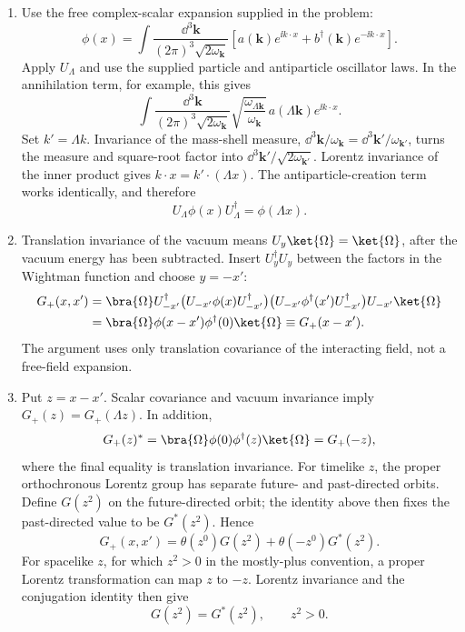 
\begin{enumerate}
\begin{enumerate}
\item
Use the free complex-scalar expansion supplied in the problem:
\[
 \phi(x)=\int\frac{\dd^3\mathbf k}{(2\pi)^3\sqrt{2\omega_{\mathbf k}}}
 \left[a(\mathbf k)e^{\ii k\cdot x}
 +b^\dagger(\mathbf k)e^{-\ii k\cdot x}\right].
\]
Apply \(U_\Lambda\) and use the supplied particle and antiparticle
oscillator laws.  In the
annihilation term, for example, this gives
\[
 \int\frac{\dd^3\mathbf k}{(2\pi)^3\sqrt{2\omega_{\mathbf k}}}
 \sqrt{\frac{\omega_{\Lambda\mathbf k}}{\omega_{\mathbf k}}}\,
 a(\Lambda\mathbf k)e^{\ii k\cdot x}.
\]
Set \(k'=\Lambda k\).  Invariance of the mass-shell measure,
\(\dd^3\mathbf k/\omega_{\mathbf k}=\dd^3\mathbf k'/\omega_{\mathbf k'}\),
turns the measure and square-root factor into
\(\dd^3\mathbf k'/\sqrt{2\omega_{\mathbf k'}}\).  Lorentz invariance of the
inner product gives \(k\cdot x=k'\cdot(\Lambda x)\).  The
antiparticle-creation term works identically, and therefore
\[
 U_\Lambda\phi(x)U_\Lambda^\dagger=\phi(\Lambda x).
\]

\item
Translation invariance of the vacuum means
\(U_y\ket{\Omega}=\ket{\Omega}\), after the vacuum energy has been
subtracted.  Insert \(U_y^\dagger U_y\) between the factors in the Wightman
function and choose \(y=-x'\):
\[
 \begin{split}
 G_+(x,x')
 &=\bra{\Omega}U_{-x'}^\dagger
 \bigl(U_{-x'}\phi(x)U_{-x'}^\dagger\bigr)
 \bigl(U_{-x'}\phi^\dagger(x')U_{-x'}^\dagger\bigr)
 U_{-x'}\ket{\Omega}\\
 &=\bra{\Omega}\phi(x-x')\phi^\dagger(0)\ket{\Omega}
 \equiv G_+(x-x').
 \end{split}
\]
The argument uses only translation covariance of the interacting field, not a
free-field expansion.

\item
Put \(z=x-x'\).  Scalar covariance and vacuum invariance imply
\(G_+(z)=G_+(\Lambda z)\).  In addition,
\[
 G_+(z)^*
 =\bra{\Omega}\phi(0)\phi^\dagger(z)\ket{\Omega}
 =G_+(-z),
\]
where the final equality is translation invariance.  For timelike \(z\), the
proper orthochronous Lorentz group has separate future- and past-directed
orbits.  Define \(G(z^2)\) on the future-directed orbit; the identity above
then fixes the past-directed value to be \(G^*(z^2)\).  Hence
\[
 G_+(x,x')=
 \theta(z^0)G(z^2)+\theta(-z^0)G^*(z^2).
\]
For spacelike \(z\), for which \(z^2>0\) in the mostly-plus convention, a
proper Lorentz transformation can map \(z\) to \(-z\).  Lorentz invariance and
the conjugation identity then give
\[
 G(z^2)=G^*(z^2),\qquad z^2>0.
\]


\end{enumerate}
\end{enumerate}
